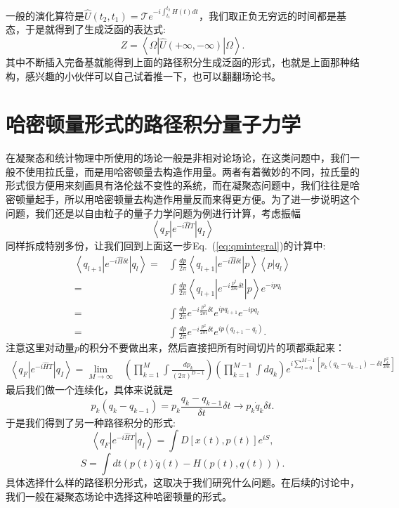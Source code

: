 \documentclass[12pt, a4paper, oneside]{ctexart}
\begin{document}
一般的演化算符是$\hat U(t_2,t_1)=\mathcal T e^{-i\int_{t_1}^{t_2}H(t)dt}$，我们取正负无穷远的时间都是基态，于是就得到了生成泛函的表达式:
\begin{equation}
    Z=\left<\Omega |\hat U(+\infty,-\infty)| \Omega \right>.
\end{equation}
其中不断插入完备基就能得到上面的路径积分生成泛函的形式，也就是上面那种结构，感兴趣的小伙伴可以自己试着推一下，也可以翻翻场论书。

\section{哈密顿量形式的路径积分量子力学}
在凝聚态和统计物理中所使用的场论一般是非相对论场论，在这类问题中，我们一般不使用拉氏量，而是用哈密顿量去构造作用量。两者有着微妙的不同，拉氏量的形式很方便用来刻画具有洛伦兹不变性的系统，而在凝聚态问题中，我们往往是哈密顿量起手，所以用哈密顿量去构造作用量反而来得更方便。为了进一步说明这个问题，我们还是以自由粒子的量子力学问题为例进行计算，考虑振幅
\begin{equation}
    \left< q_F | e^{-i\hat HT} | q_I \right>
\end{equation}
同样拆成特别多份，让我们回到上面这一步Eq.~(\ref{eq:qmintegral})的计算中:
\begin{align} 
\left< q_{l+1}| e^{-i\hat H\delta t} | q_{l} \right>=&\int \frac{dp}{2\pi}\left< q_{l+1}| e^{-i\hat H\delta t} | p \right>\left< p| q_l \right>\nonumber\\
 =&\int \frac{dp}{2\pi}\left< q_{l+1}| e^{-i\frac{p^2}{2m}\delta t} | p \right>e^{-ipq_l}\nonumber\\
  =&\int \frac{dp}{2\pi}e^{-i\frac{p^2}{2m}\delta t}e^{ipq_{l+1}}e^{-ipq_l}\nonumber\\ 
  =&\int \frac{dp}{2\pi}e^{-i\frac{p^2}{2m}\delta t}e^{ip(q_{l+1}-q_l)}.
\end{align}
注意这里对动量$p$的积分不要做出来，然后直接把所有时间切片的项都乘起来：
\begin{align}  
\left< q_F | e^{-i\hat HT} | q_I \right>=\lim_{M\rightarrow\infty}&(\prod_{k=1}^{M}\int \frac{dp_k}{(2\pi)^{D-1}}) (\prod_{k=1}^{M-1}\int dq_k) e^{i\sum_{l=0}^{M-1}[p_k(q_k-q_{k-1})-\delta t\frac{p_k^2}{2m}]}  
\end{align}
最后我们做一个连续化，具体来说就是
\begin{equation}
    p_k(q_k-q_{k-1})=p_k\frac{q_k-q_{k-1}}{\delta t} \delta t\rightarrow p_k\dot q_k\delta t.
\end{equation}
于是我们得到了另一种路径积分的形式:
\begin{equation}
    \left< q_F | e^{-i\hat HT} | q_I \right>=\int D[x(t),p(t)]e^{iS},
\end{equation}
\begin{equation}
    S=\int dt (p(t)\dot q(t)-H(p(t),q(t))).
\end{equation}
具体选择什么样的路径积分形式，这取决于我们研究什么问题。在后续的讨论中，我们一般在凝聚态场论中选择这种哈密顿量的形式。
\end{document}
